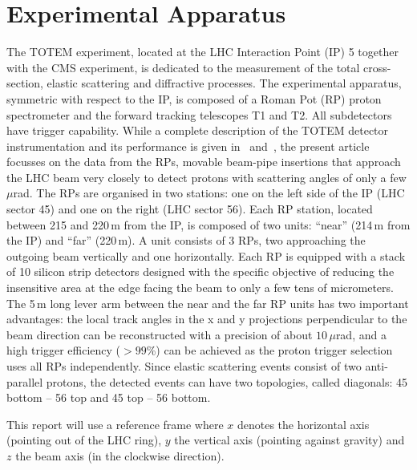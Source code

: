 \section{Experimental Apparatus}
\label{sec:exp apparatus}

The TOTEM experiment, located at the LHC Interaction Point (IP) 5 together with
the CMS experiment, is dedicated to the measurement of the total 
cross-section, elastic scattering
and diffractive processes. The experimental
apparatus, symmetric with respect to the IP, is 
composed of a Roman Pot (RP) proton spectrometer and the forward tracking 
telescopes T1 and T2. All subdetectors have trigger capability. 
While a complete description of the TOTEM detector instrumentation 
and its performance is given in~\cite{totem-jinst} and~\cite{totem-ijmp}, 
the present article focusses on the data from the RPs, movable beam-pipe
insertions that approach the LHC beam very closely to detect protons with
scattering angles of only a few $\mu$rad. 
The RPs are organised in two stations: one on the left side of the IP 
(LHC sector 45) and one on the right (LHC sector 56).
Each RP station, located between 215 and 220\,m from the IP, is composed of two 
units: ``near'' (214\,m from the IP) and ``far'' (220\,m). 
A unit consists of 3 RPs, two
approaching the outgoing beam vertically and one horizontally.
Each RP is equipped with a stack of 10 silicon
strip detectors designed with the specific objective of
reducing the insensitive area at the edge facing the beam
to only a few tens of micrometers. The 5\,m long lever arm 
between the near and the far RP units has two important
advantages: the local track angles in the x and y projections
perpendicular to the beam direction can be reconstructed
with a precision of about $10\,\mu$rad, and a high trigger efficiency
($> 99$\%) can be achieved as the proton trigger selection
uses all RPs independently. Since elastic scattering events consist of two anti-parallel protons, the detected events can have two topologies, called diagonals: 45 bottom -- 56 top and 45 top -- 56 bottom.

This report will use a reference frame where $x$ denotes the horizontal axis (pointing out of the LHC ring), $y$ the vertical axis (pointing against gravity) and $z$ the beam axis (in the clockwise direction).
